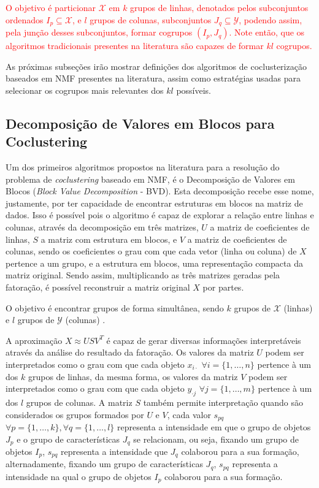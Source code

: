 \documentclass[
    12pt,                %
    oneside,            %
    a4paper,            %
    english,            %
    brazil                %
    ]{abntex2ppgsi}
\begin{document}
\textcolor{red}{O objetivo é particionar $\mathcal{X}$ em $k$ grupos de linhas, denotados pelos subconjuntos ordenados $I_p \subseteq \mathcal{X}$, e $l$ grupos de colunas, subconjuntos $J_q \subseteq \mathcal{Y}$, podendo assim, pela junção desses subconjuntos, formar cogrupos $(I_p, J_q)$.
Note então, que os algoritmos tradicionais presentes na literatura são capazes de formar $k l$ cogrupos.}

As próximas subseções irão mostrar definições dos algoritmos de coclusterização baseados em NMF presentes na literatura, assim como estratégias usadas para selecionar os cogrupos mais relevantes dos $k l$ possíveis.

\subsection{Decomposição de Valores em Blocos para Coclustering}
\label{subsec:bvd}

Um dos primeiros algoritmos propostos na literatura para a resolução do problema de \textit{coclustering} baseado em NMF, é o Decomposição de Valores em Blocos (\textit{Block Value Decomposition} - BVD).
Esta decomposição recebe esse nome, justamente, por ter capacidade de encontrar estruturas em blocos na matriz de dados.
Isso é possível pois o algoritmo é capaz de explorar a relação entre linhas e colunas, através da decomposição em três matrizes, $U$ a matriz de coeficientes de linhas, $S$ a matriz com estrutura em blocos, e $V$ a matriz de coeficientes de colunas, sendo os coeficientes o grau com que cada vetor (linha ou coluna) de $X$ pertence a um grupo, e a estrutura em blocos, uma representação compacta da matriz original.
Sendo assim, multiplicando as três matrizes geradas pela fatoração, é possível reconstruir a matriz original $X$ por partes.

O objetivo é encontrar grupos de forma simultânea, sendo $k$ grupos de $\mathcal{X}$ (linhas) e $l$ grupos de $\mathcal{Y}$ (colunas) \cite{Long2005}.

A aproximação $X \approx USV^T$ é capaz de gerar diversas informações interpretáveis através da análise do resultado da fatoração.
Os valores da matriz $U$ podem ser interpretados como o grau com que cada objeto $x_{i \cdot}$ $\forall i = \{1, \dots, n\}$ pertence à um dos $k$ grupos de linhas, da mesma forma, os valores da matriz $V$ podem ser interpretados como o grau com que cada objeto $y_{\cdot j}$ $\forall j = \{1, \dots, m\}$ pertence à um dos $l$ grupos de colunas.
A matriz $S$ também permite interpretação quando são considerados os grupos formados por $U$ e $V$, cada valor $s_{pq}$ $\forall p = \{1, \dots, k\}, \forall q = \{1, \dots, l\}$ representa a intensidade em que o grupo de objetos $J_p$ e o grupo de características $J_q$ se relacionam, ou seja, fixando um grupo de objetos $I_p$, $s_{pq}$ representa a intensidade que $J_q$ colaborou para a sua formação, alternadamente, fixando um grupo de características $J_q$, $s_{pq}$ representa a intensidade na qual o grupo de objetos $I_p$ colaborou para a sua formação.
\end{document}
